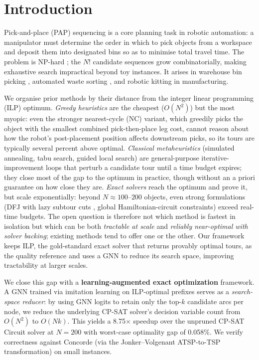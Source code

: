 \documentclass[review,times]{elsarticle}
\begin{document}
\section{Introduction}

Pick-and-place (PAP) sequencing is a core planning task in robotic automation: a manipulator must determine the order in which to pick objects from a workspace and deposit them into designated bins so as to minimise total travel time. The problem is NP-hard \cite{chalasani1996}; the $N!$ candidate sequences grow combinatorially, making exhaustive search impractical beyond toy instances. It arises in warehouse bin picking \cite{cheng2024drl}, automated waste sorting \cite{gundupalli2021sequence, kiyokawa2024challenges}, and robotic kitting in manufacturing.

We organise prior methods by their distance from the integer linear programming (ILP) optimum. \emph{Greedy heuristics} are the cheapest ($O(N^2)$) but the most myopic: even the stronger nearest-cycle (NC) variant, which greedily picks the object with the smallest combined pick-then-place leg cost, cannot reason about how the robot's post-placement position affects downstream picks, so its tours are typically several percent above optimal. \emph{Classical metaheuristics} (simulated annealing, tabu search, guided local search) are general-purpose iterative-improvement loops that perturb a candidate tour until a time budget expires; they close most of the gap to the optimum in practice, though without an a priori guarantee on how close they are. \emph{Exact solvers} reach the optimum and prove it, but scale exponentially: beyond $N\!\approx\!100\text{--}200$ objects, even strong formulations (DFJ with lazy subtour cuts \cite{dantzig1954}, global Hamiltonian-circuit constraints) exceed real-time budgets. The open question is therefore not which method is fastest in isolation but which can be both \emph{tractable at scale} and \emph{reliably near-optimal with solver backing}; existing methods tend to offer one or the other. Our framework keeps ILP, the gold-standard exact solver that returns provably optimal tours, as the quality reference and uses a GNN to reduce its search space, improving tractability at larger scales.

We close this gap with a \textbf{learning-augmented exact optimization} framework. A GNN trained via imitation learning on ILP-optimal prefixes serves as a \emph{search-space reducer}: by using GNN logits to retain only the top-$k$ candidate arcs per node, we reduce the underlying CP-SAT solver's decision variable count from $O(N^2)$ to $O(Nk)$. This yields a 8.75$\times$ speedup over the unpruned CP-SAT Circuit solver at $N{=}200$ with worst-case optimality gap of 0.058\%. We verify correctness against Concorde \cite{applegate2006concorde} (via the Jonker--Volgenant ATSP-to-TSP transformation) on small instances.
\end{document}
